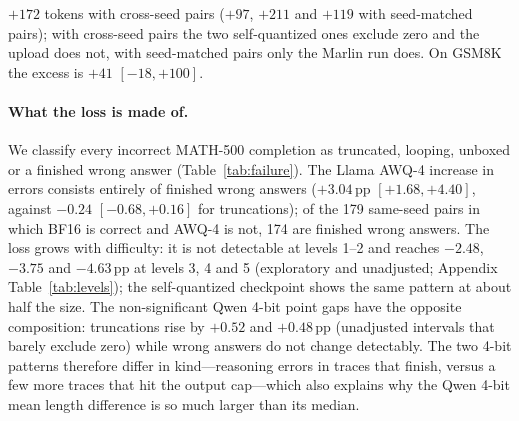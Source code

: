 \documentclass[11pt,a4paper]{article}
\begin{document}
$+172$ tokens with cross-seed pairs ($+97$, $+211$ and $+119$ with seed-matched pairs); with cross-seed pairs the two self-quantized ones exclude zero and the upload does not, with seed-matched pairs only the Marlin run does. On GSM8K the excess is $+41$ $[-18,+100]$.

\paragraph{What the loss is made of.}
\label{sec:failure}
We classify every incorrect MATH-500 completion as truncated, looping, unboxed or a finished wrong answer (Table~\ref{tab:failure}). The Llama AWQ-4 increase in errors consists entirely of finished wrong answers ($+3.04$\,pp $[+1.68,+4.40]$, against $-0.24$ $[-0.68,+0.16]$ for truncations); of the 179 same-seed pairs in which BF16 is correct and AWQ-4 is not, 174 are finished wrong answers. The loss grows with difficulty: it is not detectable at levels 1--2 and reaches $-2.48$, $-3.75$ and $-4.63$\,pp at levels 3, 4 and 5 (exploratory and unadjusted; Appendix Table~\ref{tab:levels}); the self-quantized checkpoint shows the same pattern at about half the size. The non-significant Qwen 4-bit point gaps have the opposite composition: truncations rise by $+0.52$ and $+0.48$\,pp (unadjusted intervals that barely exclude zero) while wrong answers do not change detectably. The two 4-bit patterns therefore differ in kind---reasoning errors in traces that finish, versus a few more traces that hit the output cap---which also explains why the Qwen 4-bit mean length difference is so much larger than its median.
\end{document}
